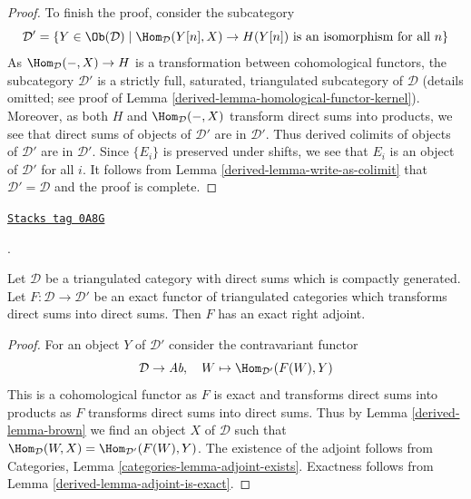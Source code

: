 \begin{proof}
\medskip\noindent
To finish the proof, consider the subcategory
$$
\mathcal{D}' =
\{Y \in \Ob(\mathcal{D}) \mid \Hom_\mathcal{D}(Y[n], X) \to H(Y[n])
\text{ is an isomorphism for all }n\}
$$
As $\Hom_\mathcal{D}(-, X) \to H$ is a transformation between
cohomological functors,
the subcategory $\mathcal{D}'$ is a strictly full, saturated, triangulated
subcategory of $\mathcal{D}$ (details omitted; see proof of
Lemma \ref{derived-lemma-homological-functor-kernel}). Moreover, as both
$H$ and $\Hom_\mathcal{D}(-, X)$ transform direct sums into products,
we see that direct sums of objects of $\mathcal{D}'$ are in $\mathcal{D}'$.
Thus derived colimits of objects of $\mathcal{D}'$ are in $\mathcal{D}'$.
Since $\{E_i\}$ is preserved under shifts, we see that $E_i$
is an object of $\mathcal{D}'$ for all $i$. It follows from
Lemma \ref{derived-lemma-write-as-colimit} that $\mathcal{D}' = \mathcal{D}$
and the proof is complete.
\end{proof}

\begin{proposition}[Brown]
\label{derived-proposition-brown}
\href{https://stacks.math.columbia.edu/tag/0A8G}{\texttt{Stacks tag 0A8G}}

\begin{reference}
\cite[Theorem 4.1]{Neeman-Grothendieck}.
\end{reference}
Let $\mathcal{D}$ be a triangulated category with direct sums which is
compactly generated. Let $F : \mathcal{D} \to \mathcal{D}'$ be an
exact functor of triangulated categories which transforms direct sums
into direct sums. Then $F$ has an exact right adjoint.
\end{proposition}

\begin{proof}

For an object $Y$ of $\mathcal{D}'$ consider the contravariant functor
$$
\mathcal{D} \to \textit{Ab},\quad W \mapsto \Hom_{\mathcal{D}'}(F(W), Y)
$$
This is a cohomological functor as $F$ is exact and transforms direct sums
into products as $F$ transforms direct sums into direct sums. Thus by
Lemma \ref{derived-lemma-brown} we find an object $X$ of $\mathcal{D}$ such that
$\Hom_\mathcal{D}(W, X) = \Hom_{\mathcal{D}'}(F(W), Y)$.
The existence of the adjoint follows from
Categories, Lemma \ref{categories-lemma-adjoint-exists}.
Exactness follows from Lemma \ref{derived-lemma-adjoint-is-exact}.
\end{proof}

